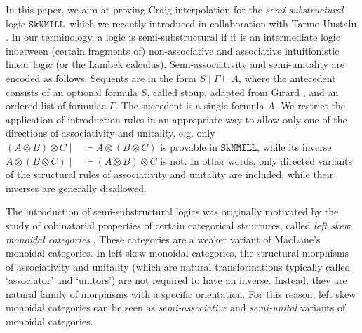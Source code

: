 \documentclass[sn-mathphys-num]{sn-jnl}%
\newcommand{\vd}{\vdash}
\newcommand{\ot}{\otimes}
\newcommand{\SkNMILL}{$\mathtt{SkNMILL}$}
\theoremstyle{thmstyleone}%
\theoremstyle{thmstyletwo}%
\theoremstyle{thmstylethree}%
\begin{document}
In this paper, we aim at proving Craig interpolation for the \emph{semi-substructural} logic \SkNMILL\ which we recently introduced in collaboration with Tarmo Uustalu \cite{UVW:protsn}.
In our terminology, a logic is semi-substructural if it is an intermediate logic inbetween (certain fragments of) non-associative and associative intuitionistic linear logic (or the Lambek calculus).
Semi-associativity and semi-unitality are encoded as follows.
Sequents are in the form $S \mid \Gamma \vdash A$, where the antecedent consists of an optional formula $S$, called stoup, adapted from Girard \cite{girard:constructive:91}, and an ordered list of formulae $\Gamma$.
The succedent is a single formula $A$.
We restrict the application of introduction rules in an appropriate way to allow only one of the directions of associativity and unitality, e.g. only $(A \ot B)\ot C \mid \quad \vd A \ot (B \ot C)$ is provable in \SkNMILL, while its inverse $A \ot (B \ot C) \mid \quad \vd (A \ot B) \ot C$ is not.
In other words, only directed variants of the structural rules of associativity and unitality are included, while their inverses are generally disallowed.

The introduction of semi-substructural logics was originally motivated by the study of cobinatorial properties of certain categorical structures, called \emph{left skew monoidal categories} \cite{szlachanyi:skew-monoidal:2012}.
These categories are a weaker variant of MacLane's monoidal categories.
In left skew monoidal categories, the structural morphisms of associativity and unitality (which are natural transformations typically called `associator' and `unitors') are not required to have an inverse. Instead, they are natural family of morphisms with a specific orientation.
For this reason, left skew monoidal categories can be seen as \emph{semi-associative} and \emph{semi-unital} variants of monoidal categories. 
\end{document}

